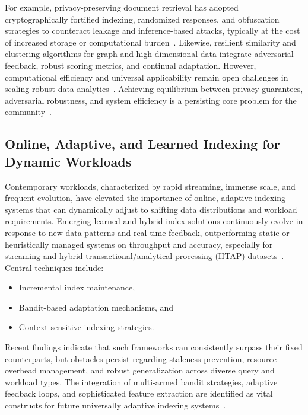 \documentclass[sigconf]{acmart}
\begin{document}
For example, privacy-preserving document retrieval has adopted cryptographically fortified indexing, randomized responses, and obfuscation strategies to counteract leakage and inference-based attacks, typically at the cost of increased storage or computational burden~\cite{ref110,ref118}. Likewise, resilient similarity and clustering algorithms for graph and high-dimensional data integrate adversarial feedback, robust scoring metrics, and continual adaptation. However, computational efficiency and universal applicability remain open challenges in scaling robust data analytics~\cite{ref107,ref110}. Achieving equilibrium between privacy guarantees, adversarial robustness, and system efficiency is a persisting core problem for the community~\cite{ref118}.

\subsection{Online, Adaptive, and Learned Indexing for Dynamic Workloads}

Contemporary workloads, characterized by rapid streaming, immense scale, and frequent evolution, have elevated the importance of online, adaptive indexing systems that can dynamically adjust to shifting data distributions and workload requirements. Emerging learned and hybrid index solutions continuously evolve in response to new data patterns and real-time feedback, outperforming static or heuristically managed systems on throughput and accuracy, especially for streaming and hybrid transactional/analytical processing (HTAP) datasets~\cite{ref105,ref110,ref111,ref118}. Central techniques include:

\begin{itemize}
    \item Incremental index maintenance,
    \item Bandit-based adaptation mechanisms, and
    \item Context-sensitive indexing strategies.
\end{itemize}

Recent findings indicate that such frameworks can consistently surpass their fixed counterparts, but obstacles persist regarding staleness prevention, resource overhead management, and robust generalization across diverse query and workload types. The integration of multi-armed bandit strategies, adaptive feedback loops, and sophisticated feature extraction are identified as vital constructs for future universally adaptive indexing systems~\cite{ref110,ref118}.
\end{document}
